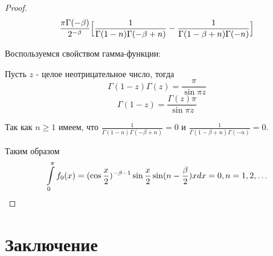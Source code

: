 ﻿\documentclass[oneside, final, 14pt]{extreport}
\begin{document}
\begin{proof}
		$$
			\frac{\pi\Gamma(-\beta)}{2^{-\beta}}\Bigl[\frac{1}{\Gamma(1 - n)\Gamma(-\beta + n)} - 
			\frac{1}{\Gamma(1 -\beta + n)\Gamma(- n)}\Bigr]
		$$
		
		Воспользуемся свойством гамма-функции: 
		
		Пусть $z$ - целое неотрицательное число, тогда
		$$
			\Gamma(1 - z)\Gamma(z) = \frac{\pi}{\sin\pi z}
		$$
		$$
			\Gamma(1 - z) = \frac{\Gamma(z)\pi}{\sin\pi z} 
		$$
		
		\bigskip
		Так как $n \geq 1$ имеем, что $\frac{1}{\Gamma(1 - n)\Gamma(-\beta + n)} = 0$ и
		$\frac{1}{\Gamma(1 -\beta + n)\Gamma(- n)} = 0$. 
		
		Таким образом 
		$$
			\int\limits_0^\pi f_0(x) = (\cos\frac{x}{2})^{-\beta-1}\sin\frac{x}{2}\sin(n - \frac{\beta}{2})xdx = 0, n = 1, 2, \ldots 
		$$
		
	\end{proof}




	
\chapter*{Заключение}
	
\end{document}
